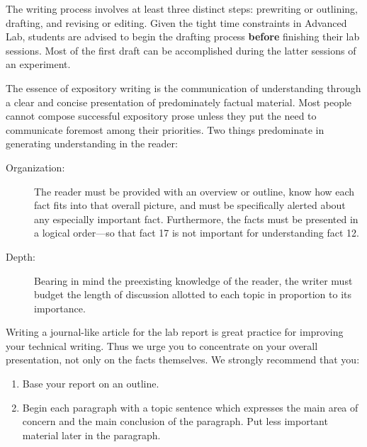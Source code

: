 The writing process involves at least three distinct steps: prewriting or outlining,
drafting, and revising or editing.  Given the tight time constraints in Advanced
Lab, students are advised to begin the drafting process \textbf{before}
finishing their lab sessions.  Most of the first draft can be accomplished during
the latter sessions of an experiment.

The essence of expository writing is the communication of understanding
through a clear and concise presentation of predominately factual
material.\cite{mayfield1998,pritchard1990} Most people cannot
compose successful expository prose unless they put the need to
communicate foremost among their priorities. Two things predominate
in generating understanding in the reader:
\begin{description}
\item[Organization:] The reader must be provided with an overview or
outline, know how each fact fits into that overall picture,
and must be specifically alerted about any especially important fact.
Furthermore, the facts must be presented in a logical order---so
that fact 17 is not important for understanding fact 12.
\item[Depth:] Bearing in mind the preexisting
knowledge of the reader, the writer must budget the length of
discussion allotted to each topic in proportion to its importance.
\end{description}

Writing a journal-like article for the lab report is great practice
for improving your technical writing.
Thus we urge you to concentrate on your overall presentation,
not only on the facts themselves.
We strongly recommend that you:
\begin{enumerate}
\item Base your report on an outline.
\item Begin each paragraph with a topic sentence which expresses the
main area of concern and the main conclusion of the paragraph. Put
less important material later in the paragraph.
\end{enumerate}

